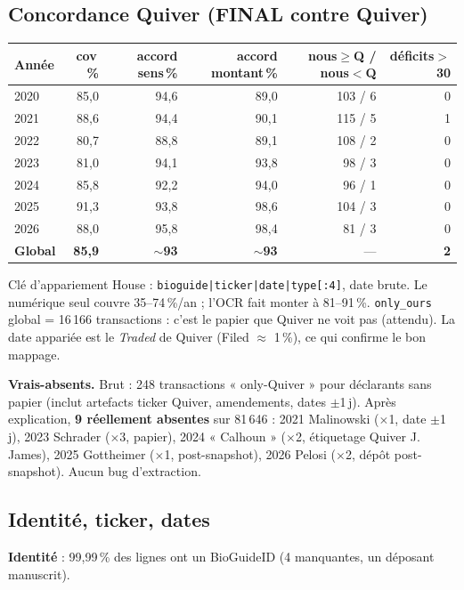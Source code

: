 \documentclass[11pt,a4paper]{article}
\begin{document}
\subsection{Concordance Quiver (FINAL contre Quiver)}
\begin{center}\small
\begin{tabular}{@{}lrrrrr@{}}
\toprule
\textbf{Année} & \textbf{cov\,\%} & \textbf{accord sens\,\%} & \textbf{accord montant\,\%} & \textbf{nous$\geq$Q / nous$<$Q} & \textbf{déficits$>$30} \\
\midrule
2020 & 85,0 & 94,6 & 89,0 & 103 / 6 & 0 \\
2021 & 88,6 & 94,4 & 90,1 & 115 / 5 & 1 \\
2022 & 80,7 & 88,8 & 89,1 & 108 / 2 & 0 \\
2023 & 81,0 & 94,1 & 93,8 & 98 / 3 & 0 \\
2024 & 85,8 & 92,2 & 94,0 & 96 / 1 & 0 \\
2025 & 91,3 & 93,8 & 98,6 & 104 / 3 & 0 \\
2026 & 88,0 & 95,8 & 98,4 & 81 / 3 & 0 \\
\midrule
\textbf{Global} & \textbf{85,9} & \textbf{$\sim$93} & \textbf{$\sim$93} & --- & \textbf{2} \\
\bottomrule
\end{tabular}
\end{center}
Clé d'appariement House : \texttt{bioguide|ticker|date|type[:4]}, date brute. Le numérique seul couvre
35--74\,\%/an ; l'OCR fait monter à 81--91\,\%. \texttt{only\_ours} global = 16\,166 transactions :
c'est le papier que Quiver ne voit pas (attendu). La date appariée est le \emph{Traded} de Quiver
(Filed $\approx$ 1\,\%), ce qui confirme le bon mappage.

\textbf{Vrais-absents.} Brut : 248 transactions « only-Quiver » pour déclarants sans papier (inclut
artefacts ticker Quiver, amendements, dates $\pm$1\,j). Après explication, \textbf{9 réellement
absentes} sur 81\,646 : 2021 Malinowski ($\times$1, date $\pm$1\,j), 2023 Schrader ($\times$3,
papier), 2024 « Calhoun » ($\times$2, étiquetage Quiver J. James), 2025 Gottheimer ($\times$1,
post-snapshot), 2026 Pelosi ($\times$2, dépôt post-snapshot). Aucun bug d'extraction.

\subsection{Identité, ticker, dates}
\textbf{Identité} : 99,99\,\% des lignes ont un BioGuideID (4 manquantes, un déposant manuscrit).
\end{document}
